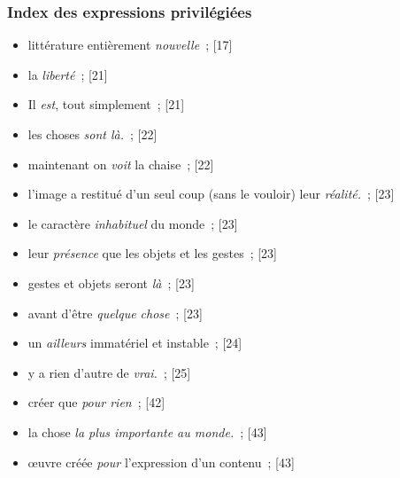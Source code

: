 \documentclass[12pt, a4paper]{article}
\begin{document}
\subsubsection{Index des expressions privilégiées}
	
	
\begin{itemize}

	\item littérature entièrement \textit{nouvelle}{\color{gray}~; [17]}

	\item la \textit{liberté}{\color{gray}~; [21]}

	\item Il \textit{est}, tout simplement{\color{gray}~; [21]}

	\item les choses \textit{sont là.}{\color{gray}~; [22]}

	\item maintenant on \textit{voit} la chaise{\color{gray}~; [22]}

	\item l’image a restitué d’un seul coup (sans le vouloir) leur \textit{réalité.}{\color{gray}~; [23]}

	\item le caractère \textit{inhabituel} du monde{\color{gray}~; [23]}

	\item leur \textit{présence} que les objets et les gestes{\color{gray}~; [23]}

	\item gestes et objets seront \textit{là}{\color{gray}~; [23]}

	\item avant d’être \textit{quelque chose}{\color{gray}~; [23]}

	\item un \textit{ailleurs} immatériel et instable{\color{gray}~; [24]}

	\item y a rien d’autre de \textit{vrai.}{\color{gray}~; [25]}

	\item créer que \textit{pour rien}{\color{gray}~; [42]}

	\item la chose \textit{la plus importante au monde.}{\color{gray}~; [43]}

	\item œuvre créée \textit{pour } l’expression d’un contenu{\color{gray}~; [43]}


\end{itemize}
\end{document}
